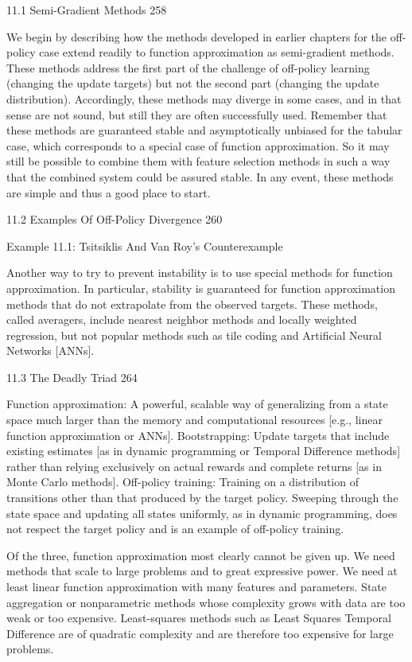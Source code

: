 11.1 Semi-Gradient Methods 258

We begin by describing how the methods developed in earlier chapters for the off-policy case extend readily to function approximation as semi-gradient methods. These methods address the first part of the challenge of off-policy learning (changing the update targets) but not the second part (changing the update distribution). Accordingly, these methods may diverge in some cases, and in that sense are not sound, but still they are often successfully used. Remember that these methods are guaranteed stable and asymptotically unbiased for the tabular case, which corresponds to a special case of function approximation. So it may still be possible to combine them with feature selection methods in such a way that the combined system could be assured stable. In any event, these methods are simple and thus a good place to start.

11.2 Examples Of Off-Policy Divergence 260

Example 11.1: Tsitsiklis And Van Roy's Counterexample

Another way to try to prevent instability is to use special methods for function approximation. In particular, stability is guaranteed for function approximation methods that do not extrapolate from the observed targets. These methods, called averagers, include nearest neighbor methods and locally weighted regression, but not popular methods such as tile coding and Artificial Neural Networks [ANNs].

11.3 The Deadly Triad 264

Function approximation: A powerful, scalable way of generalizing from a state space much larger than the memory and computational resources [e.g., linear function approximation or ANNs].
Bootstrapping: Update targets that include existing estimates [as in dynamic programming or Temporal Difference methods] rather than relying exclusively on actual rewards and complete returns [as in Monte Carlo methods].
Off-policy training: Training on a distribution of transitions other than that produced by the target policy. Sweeping through the state space and updating all states uniformly, as in dynamic programming, does not respect the target policy and is an example of off-policy training.

Of the three, function approximation most clearly cannot be given up. We need methods that scale to large problems and to great expressive power. We need at least linear function approximation with many features and parameters. State aggregation or nonparametric methods whose complexity grows with data are too weak or too expensive. Least-squares methods such as Least Squares Temporal Difference are of quadratic complexity and are therefore too expensive for large problems.

